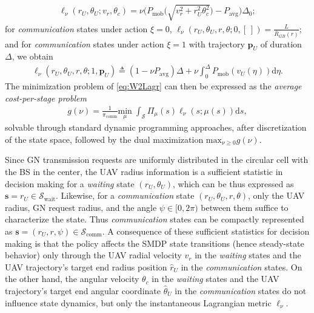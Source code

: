 \documentclass[12pt, draftcls, onecolumn]{IEEEtran}
\theoremstyle{plain}
\theoremstyle{definition}
\theoremstyle{remark}
\begin{document}
\begin{align}\label{eq:EllWait}
    \ell_\nu(r_U,\theta_U; v_r,\theta_c)
    =\nu \Big(P_{\mathrm{mob}} \Big(\sqrt{v_{r}^{2} + r_U^2\theta_{c}^{2}}\Big)- P_{\mathrm{avg}} \Big)\Delta_0;
    \end{align}
    for \emph{communication} states under action $\xi=0$, $\ell_{\nu}(r_U,\theta_U,r,\theta; 0, [\ ]) = \frac{L}{\bar{R}_{GB}(r)}$; and for \emph{communication} states under action $\xi=1$ with trajectory 
    $\mathbf p_U$ of duration $\Delta$, we obtain
    \begin{align}\label{eq:EllComm}
    \ell_\nu(r_U,\theta_U,r,\theta; 1,\mathbf p_U)
    \triangleq(1-\nu P_{\mathrm{avg}})\Delta + \nu \int_0^\Delta P_{\mathrm{mob}} \left(v_U (\eta) \right)\mathrm d\eta.
\end{align}
The minimization problem of \eqref{eq:W2Lagr} can then be expressed as the \emph{average cost-per-stage problem}
\begin{align}\label{eq:TotalGMin}
	g(\nu) = \frac{1}{\pi_{\mathrm{comm}}}\underset{\mu}{\mathrm{min}} \; \int_{\mathcal{S}} \Pi_{\mu}(s) 
	\ell_\nu(s; \mu(s))\mathrm d s,
\end{align}
solvable through standard dynamic programming approaches, after discretization of the state space, followed by the dual maximization $\mathrm{max}_{\nu{\geq}0}g(\nu)$.

Since GN transmission requests are uniformly distributed in the circular cell with the BS in the center, the UAV radius information is a sufficient statistic in decision making for a \emph{waiting} state $(r_{U},\theta_{U})$, which can be thus expressed as $\mathbf{s}{=}r_{U}{\in}\mathcal{S}_{\mathrm{wait}}$. Likewise, for a \emph{communication} state $(r_{U},\theta_{U},r,\theta)$, only the UAV radius, GN request radius, and the angle $\psi{\in}[0,2\pi)$ between them suffice to characterize the state. Thus \emph{communication} states can be compactly represented as $\mathbf{s}{=}(r_{U},r,\psi){\in}\mathcal{S}_{\mathrm{comm}}$. A consequence of these sufficient statistics for decision making is that the policy affects the SMDP state transitions (hence steady-state behavior) only through the UAV radial velocity $v_{r}$ in the \emph{waiting} states and the UAV trajectory's target end radius position $\hat{r}_{U}$ in the \emph{communication} states. On the other hand, the angular velocity $\theta_{c}$ in the \emph{waiting} states and the UAV trajectory's target end angular coordinate $\hat{\theta}_{U}$ in the \emph{communication} states do not influence state dynamics, but only the instantaneous Lagrangian metric $\ell_{\nu}$.
\end{document}
